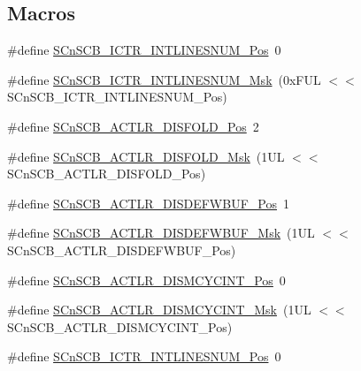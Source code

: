 \subsection*{Macros}
\begin{DoxyCompactItemize}
\item 
\#define \hyperlink{group___c_m_s_i_s___s_cn_s_c_b_ga0777ddf379af50f9ca41d40573bfffc5}{S\-Cn\-S\-C\-B\-\_\-\-I\-C\-T\-R\-\_\-\-I\-N\-T\-L\-I\-N\-E\-S\-N\-U\-M\-\_\-\-Pos}~0
\item 
\#define \hyperlink{group___c_m_s_i_s___s_cn_s_c_b_ga3efa0f5210051464e1034b19fc7b33c7}{S\-Cn\-S\-C\-B\-\_\-\-I\-C\-T\-R\-\_\-\-I\-N\-T\-L\-I\-N\-E\-S\-N\-U\-M\-\_\-\-Msk}~(0x\-F\-U\-L $<$$<$ S\-Cn\-S\-C\-B\-\_\-\-I\-C\-T\-R\-\_\-\-I\-N\-T\-L\-I\-N\-E\-S\-N\-U\-M\-\_\-\-Pos)
\item 
\#define \hyperlink{group___c_m_s_i_s___s_cn_s_c_b_gaab395870643a0bee78906bb15ca5bd02}{S\-Cn\-S\-C\-B\-\_\-\-A\-C\-T\-L\-R\-\_\-\-D\-I\-S\-F\-O\-L\-D\-\_\-\-Pos}~2
\item 
\#define \hyperlink{group___c_m_s_i_s___s_cn_s_c_b_gaa9dd2d4a2350499188f438d0aa9fd982}{S\-Cn\-S\-C\-B\-\_\-\-A\-C\-T\-L\-R\-\_\-\-D\-I\-S\-F\-O\-L\-D\-\_\-\-Msk}~(1\-U\-L $<$$<$ S\-Cn\-S\-C\-B\-\_\-\-A\-C\-T\-L\-R\-\_\-\-D\-I\-S\-F\-O\-L\-D\-\_\-\-Pos)
\item 
\#define \hyperlink{group___c_m_s_i_s___s_cn_s_c_b_gafa2eb37493c0f8dae77cde81ecf80f77}{S\-Cn\-S\-C\-B\-\_\-\-A\-C\-T\-L\-R\-\_\-\-D\-I\-S\-D\-E\-F\-W\-B\-U\-F\-\_\-\-Pos}~1
\item 
\#define \hyperlink{group___c_m_s_i_s___s_cn_s_c_b_ga6cda7b7219232a008ec52cc8e89d5d08}{S\-Cn\-S\-C\-B\-\_\-\-A\-C\-T\-L\-R\-\_\-\-D\-I\-S\-D\-E\-F\-W\-B\-U\-F\-\_\-\-Msk}~(1\-U\-L $<$$<$ S\-Cn\-S\-C\-B\-\_\-\-A\-C\-T\-L\-R\-\_\-\-D\-I\-S\-D\-E\-F\-W\-B\-U\-F\-\_\-\-Pos)
\item 
\#define \hyperlink{group___c_m_s_i_s___s_cn_s_c_b_gaaa3e79f5ead4a32c0ea742b2a9ffc0cd}{S\-Cn\-S\-C\-B\-\_\-\-A\-C\-T\-L\-R\-\_\-\-D\-I\-S\-M\-C\-Y\-C\-I\-N\-T\-\_\-\-Pos}~0
\item 
\#define \hyperlink{group___c_m_s_i_s___s_cn_s_c_b_ga2a2818f0489ad10b6ea2964e899d4cbc}{S\-Cn\-S\-C\-B\-\_\-\-A\-C\-T\-L\-R\-\_\-\-D\-I\-S\-M\-C\-Y\-C\-I\-N\-T\-\_\-\-Msk}~(1\-U\-L $<$$<$ S\-Cn\-S\-C\-B\-\_\-\-A\-C\-T\-L\-R\-\_\-\-D\-I\-S\-M\-C\-Y\-C\-I\-N\-T\-\_\-\-Pos)
\item 
\#define \hyperlink{group___c_m_s_i_s___s_cn_s_c_b_ga0777ddf379af50f9ca41d40573bfffc5}{S\-Cn\-S\-C\-B\-\_\-\-I\-C\-T\-R\-\_\-\-I\-N\-T\-L\-I\-N\-E\-S\-N\-U\-M\-\_\-\-Pos}~0
\item 

\end{DoxyCompactItemize}
